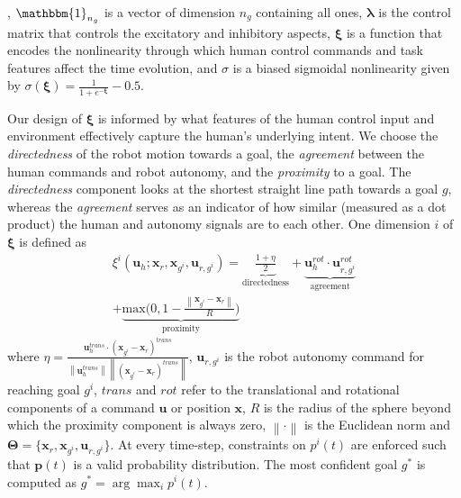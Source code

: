 \documentclass[journal]{IEEEtran}
\newcommand{\argmax}{\arg\!\max}
\newcommand{\norm}[1]{\left\lVert#1\right\rVert}
\begin{document}
, $\mathbbm{1}_{n_g}$ is a vector of dimension $n_g$ containing all ones, $\boldsymbol{\lambda}$ is the control matrix that controls the excitatory and inhibitory aspects, $\boldsymbol{\xi}$ is a function that encodes the nonlinearity through which human control commands and task features affect the time evolution, and $\sigma$ is a biased sigmoidal nonlinearity given by $\sigma(\boldsymbol{\xi}) = \frac{1}{1 + e^{-\boldsymbol{\xi}}} - 0.5$. 


Our design of $\boldsymbol{\xi}$ is informed by what features of the human control input and environment effectively capture the human's underlying intent. We choose the \textit{directedness} of the robot motion towards a goal, the \textit{agreement} between the human commands and robot autonomy, and the \textit{proximity} to a goal. The \textit{directedness} component looks at the shortest straight line path towards a goal $g$, whereas the \textit{agreement} serves as an indicator of how similar (measured as a dot product) the human and autonomy signals are to each other.
 One dimension $i$ of $\boldsymbol{\xi}$ is defined as 
\begin{multline*}
\xi^i(\boldsymbol{u}_h;\boldsymbol{x}_r, \boldsymbol{x}_{g^i}, \boldsymbol{u}_{r, g^i}) = \underbrace{\frac{1 + \eta}{2}}_{\text{directedness}} + \underbrace{\boldsymbol{u}_{h}^{rot}\cdot\boldsymbol{u}_{r,g^i}^{rot}}_{\text{agreement}}
\\+ \underbrace{\text{max}\Big(0, 1-\frac{\norm{\boldsymbol{x}_{g^i} - \boldsymbol{x}_r}}{R}\Big)}_{\text{proximity}}
\end{multline*}
where  $\eta = \frac{\boldsymbol{u}_h^{trans}\cdot(\boldsymbol{x}_{g^i} - \boldsymbol{x}_r)^{trans}}{\norm{\boldsymbol{u}_h^{trans}}\norm{(\boldsymbol{x}_{g^i} - \boldsymbol{x}_r)^{trans}}}$, $\boldsymbol{u}_{r,g^i}$ is the robot autonomy command for reaching goal $g^i$, $trans$ and $rot$ refer to the translational and rotational components of a command $\boldsymbol{u}$ or position $\boldsymbol{x}$,  $R$ is the radius of the sphere beyond which the proximity component is always zero, $\norm{\cdot}$ is the Euclidean norm and $\boldsymbol{\Theta} = \{\boldsymbol{x}_r, \boldsymbol{x}_{g^i}, \boldsymbol{u}_{r, g^i}\}$.
At every time-step, constraints on $p^i(t)$ are enforced such that $\boldsymbol{p}(t)$ is a valid probability distribution. 
The most confident goal $g^*$ is computed as $g^* = \argmax_i  p^i(t)$.
\end{document}
